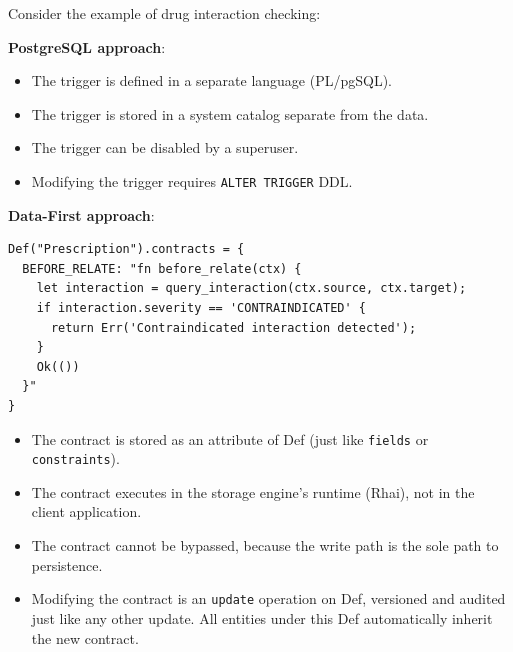 \documentclass[11pt,a4paper]{article}
\begin{document}
Consider the example of drug interaction checking:

\textbf{PostgreSQL approach}:

\begin{Shaded}
\begin{Highlighting}[]
 
  
  
 
\end{Highlighting}
\end{Shaded}

\begin{itemize}
\tightlist
\item
  The trigger is defined in a separate language (PL/pgSQL).
\item
  The trigger is stored in a system catalog separate from the data.
\item
  The trigger can be disabled by a superuser.
\item
  Modifying the trigger requires \texttt{ALTER\ TRIGGER} DDL.
\end{itemize}

\textbf{Data-First approach}:

\begin{verbatim}
Def("Prescription").contracts = {
  BEFORE_RELATE: "fn before_relate(ctx) { 
    let interaction = query_interaction(ctx.source, ctx.target);
    if interaction.severity == 'CONTRAINDICATED' {
      return Err('Contraindicated interaction detected');
    }
    Ok(())
  }"
}
\end{verbatim}

\begin{itemize}
\tightlist
\item
  The contract is stored as an attribute of Def (just like
  \texttt{fields} or \texttt{constraints}).
\item
  The contract executes in the storage engine's runtime (Rhai), not in
  the client application.
\item
  The contract cannot be bypassed, because the write path is the sole
  path to persistence.
\item
  Modifying the contract is an \texttt{update} operation on Def,
  versioned and audited just like any other update. All entities under
  this Def automatically inherit the new contract.
\end{itemize}
\end{document}
